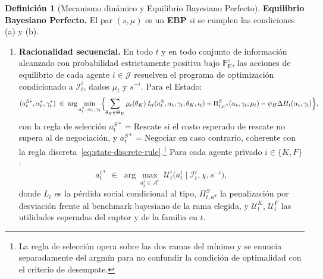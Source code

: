 \documentclass[12pt]{article}
\theoremstyle{definition}
\newtheorem{definition}[theorem]{Definición}
\theoremstyle{remark}
\newcommand{\ProbE}{\mathbb{P}_{\mathrm{E}}}
\newcommand{\1}{\mathbf{1}}
\begin{document}
\begin{definition}[Mecanismo dinámico y Equilibrio Bayesiano Perfecto]
\smallskip
\noindent\textbf{Equilibrio Bayesiano Perfecto.} El par $(s,\mu)$ es un \textbf{EBP} si se cumplen las condiciones \textup{(a)} y \textup{(b)}.
\begin{enumerate}
  \item[\textup{(a)}] \textbf{Racionalidad secuencial.} En todo $t$ y en todo conjunto de información alcanzado con probabilidad estrictamente positiva bajo $\ProbE^s$, las acciones de equilibrio de cada agente $i\in\mathcal{J}$ resuelven el programa de optimización condicionado a $\mathcal{I}_t^i$, dados $\mu_t$ y $s^{-i}$. Para el Estado:
  \[
  (a_t^{S\ast},\alpha_t^\ast,\gamma_t^\ast)\;\in\;
  \arg\min_{a_t^S,\,\alpha_t,\,\gamma_t}
  \Bigl\{
  \sum_{\theta_K\in\Theta_K}\mu_t(\theta_K)\,L_t(a_t^S,\alpha_t,\gamma_t,\theta_K,\iota_t)
  +\Pi_{t,a^S}^S(\alpha_t,\gamma_t;\mu_t)
  -\psi_H\Delta H_t(\alpha_t,\gamma_t)
  \Bigr\},
  \]
  con la regla de selección $a_t^{S\ast}=\text{Rescate}$ si el costo esperado de rescate no supera al de negociación, y $a_t^{S\ast}=\text{Negociar}$ en caso contrario, coherente con la regla discreta~\eqref{eq:state-discrete-rule}.\footnote{La regla de selección opera sobre las dos ramas del mínimo y se enuncia separadamente del argmín para no confundir la condición de optimalidad con el criterio de desempate.} Para cada agente privado $i\in\{K,F\}$:
  \[
  a_t^{i\ast}\;\in\;
  \arg\max_{a_t^i\in\mathcal{A}^i}
  \;\mathcal{U}^i_t\!\bigl(a_t^i\mid \mathcal{I}_t^i,\chi,s^{-i}\bigr),
  \]
  donde $L_t$ es la pérdida social condicional al tipo, $\Pi_{t,a^S}^S$ la penalización por desviación frente al benchmark bayesiano de la rama elegida, y $\mathcal{U}^K_t$, $\mathcal{U}^F_t$ las utilidades esperadas del captor y de la familia en $t$.


\end{enumerate}
\end{definition}
\end{document}
